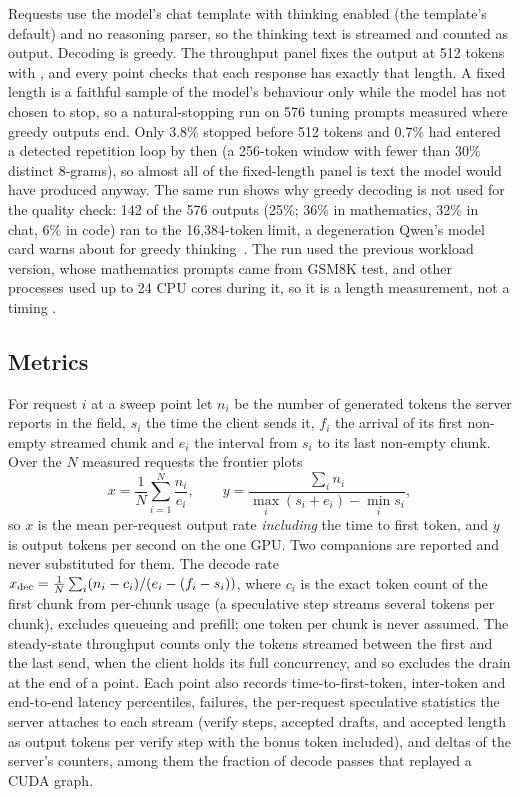 Requests use the model's chat template with thinking enabled (the template's default) and no reasoning parser, so the thinking text is streamed and counted as output. Decoding is greedy. The throughput panel fixes the output at 512 tokens with , and every point checks that each response has exactly that length. A fixed length is a faithful sample of the model's behaviour only while the model has not chosen to stop, so a natural-stopping run on 576 tuning prompts measured where greedy outputs end. Only 3.8\% stopped before 512 tokens and 0.7\% had entered a detected repetition loop by then (a 256-token window with fewer than 30\% distinct 8-grams), so almost all of the fixed-length panel is text the model would have produced anyway. The same run shows why greedy decoding is not used for the quality check: 142 of the 576 outputs (25\%; 36\% in mathematics, 32\% in chat, 6\% in code) ran to the 16,384-token limit, a degeneration Qwen's model card warns about for greedy thinking~\cite{qwencard}. The run used the previous workload version, whose mathematics prompts came from GSM8K test, and other processes used up to 24 CPU cores during it, so it is a length measurement, not a timing .

\subsection{Metrics}\label{sec:serving-metrics}
For request $i$ at a sweep point let $n_i$ be the number of generated tokens the server reports in the  field, $s_i$ the time the client sends it, $f_i$ the arrival of its first non-empty streamed chunk and $e_i$ the interval from $s_i$ to its last non-empty chunk. Over the $N$ measured requests the frontier plots
\begin{equation}
x=\frac1N\sum_{i=1}^N\frac{n_i}{e_i},\qquad y=\frac{\sum_in_i}{\max_i(s_i+e_i)-\min_is_i},\label{eq:frontier}
\end{equation}
so $x$ is the mean per-request output rate \emph{including} the time to first token, and $y$ is output tokens per second on the one GPU. Two companions are reported and never substituted for them. The decode rate $x_{\rm dec}=\frac1N\sum_i(n_i-c_i)/(e_i-(f_i-s_i))$, where $c_i$ is the exact token count of the first chunk from per-chunk usage (a speculative step streams several tokens per chunk), excludes queueing and prefill; one token per chunk is never assumed. The steady-state throughput counts only the tokens streamed between the first and the last send, when the client holds its full concurrency, and so excludes the drain at the end of a point. Each point also records time-to-first-token, inter-token and end-to-end latency percentiles, failures, the per-request speculative statistics the server attaches to each stream (verify steps, accepted drafts, and accepted length as output tokens per verify step with the bonus token included), and deltas of the server's counters, among them the fraction of decode passes that replayed a CUDA graph.


